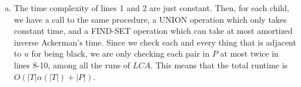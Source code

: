 \documentclass{article}
\begin{document}
\begin{enumerate}[a.]
\item
The time complexity of lines 1 and 2 are just constant. Then, for each child, we have a call to the same procedure, a UNION operation which only takes constant time, and a FIND-SET operation which can take at most amortized inverse Ackerman's time. Since we check each and every thing that is adjacent to $u$ for being black, we are only checking each pair in $P$ at most twice in lines 8-10, among all the runs of $LCA$. This means that the total runtime is $O(|T| \alpha(|T|) + |P|)$.

\end{enumerate}
\end{document}
